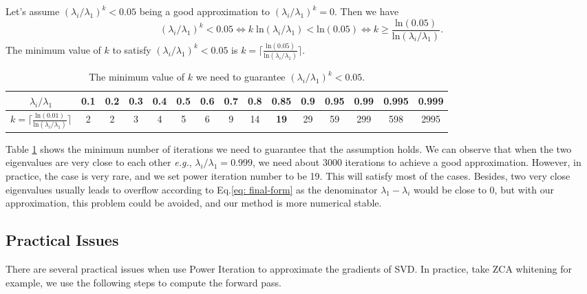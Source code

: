 Let's assume $(\lambda_i/\lambda_1)^k<0.05$ being a good approximation to $(\lambda_i/\lambda_1)^k=0$. Then we have
\begin{equation}
(\lambda_i/\lambda_1)^k<0.05 \Leftrightarrow k\; \text{ln}(\lambda_i/\lambda_1) < \text{ln}(0.05) \Leftrightarrow k \geq \frac{\text{ln}(0.05)}{\text{ln}(\lambda_i/\lambda_1)}.
\end{equation}
The minimum value of $k$ to satisfy $(\lambda_i/\lambda_1)^k<0.05$ is $k = \lceil \frac{\text{ln}(0.05)}{\text{ln}(\lambda_i/\lambda_1)} \rceil$.

\begin{table}[!htb]
\begin{centering}
\setlength\tabcolsep{4pt}
\begin{tabular}{ccccccccccccccc}
\hline
$\lambda_i/\lambda_1$ & 0.1& 0.2& 0.3 & 0.4 & 0.5 & 0.6 & 0.7 & 0.8 & \textbf{0.85} & 0.9 & 0.95 & 0.99 & 0.995 & 0.999 \\ \hline
$k = \lceil \frac{\text{ln}(0.01)}{\text{ln}(\lambda_i/\lambda_1)} \rceil $   & 2 & 2 & 3 & 4 & 5 & 6 & 9 & 14  & \textbf{19}   & 29  & 59   & 299  & 598   & 2995  \\ \hline
\end{tabular}
\caption{The minimum value of $k$ we need to guarantee $(\lambda_i/\lambda_1)^k<0.05$.}
\label{tab: kmin}
\end{centering}
\end{table}

Table \ref{tab: kmin} shows the minimum number of iterations we need to guarantee that the assumption holds. We can observe that when the two eigenvalues are very close to each other \emph{e.g.}, $\lambda_i/\lambda_1=0.999$, we need about 3000 iterations to achieve a good approximation. However, in practice, the case is very rare, and we set power iteration number to be 19. This will satisfy most of the cases. Besides, two very close eigenvalues usually leads to overflow according to Eq.\ref{eq: final-form} as the denominator $\lambda_1 - \lambda_i$ would be close to 0, but with our approximation, this problem could be avoided, and our method is more numerical stable.

\subsection{Practical Issues}
There are several practical issues when use Power Iteration to approximate the gradients of SVD.
In practice, take ZCA whitening for example, we use the following steps to compute the forward pass.

